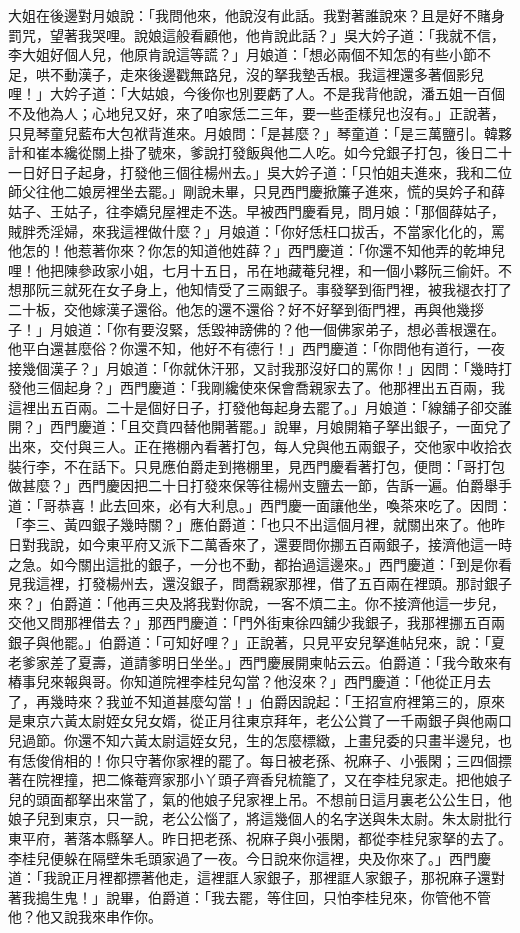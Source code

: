大姐在後邊對月娘說：「我問他來，他說沒有此話。我對著誰說來？且是好不賭身罰咒，望著我哭哩。說娘這般看顧他，他肯說此話？」吳大妗子道：「我就不信，李大姐好個人兒，他原肯說這等謊？」月娘道：「想必兩個不知怎的有些小節不足，哄不動漢子，走來後邊戳無路兒，沒的拏我墊舌根。我這裡還多著個影兒哩！」大妗子道：「大姑娘，今後你也別要虧了人。不是我背他說，潘五姐一百個不及他為人；心地兒又好，來了咱家恁二三年，要一些歪樣兒也沒有。」正說著，只見琴童兒藍布大包袱背進來。月娘問：「是甚麼？」琴童道：「是三萬鹽引。韓夥計和崔本纔從關上掛了號來，爹說打發飯與他二人吃。如今兌銀子打包，後日二十一日好日子起身，打發他三個往楊州去。」吳大妗子道：「只怕姐夫進來，我和二位師父往他二娘房裡坐去罷。」剛說未畢，只見西門慶掀簾子進來，慌的吳妗子和薛姑子、王姑子，往李嬌兒屋裡走不迭。早被西門慶看見，問月娘：「那個薛姑子，賊胖禿淫婦，來我這裡做什麼？」月娘道：「你好恁枉口拔舌，不當家化化的，罵他怎的！他惹著你來？你怎的知道他姓薛？」西門慶道：「你還不知他弄的乾坤兒哩！他把陳參政家小姐，七月十五日，吊在地藏菴兒裡，和一個小夥阮三偷奸。不想那阮三就死在女子身上，他知情受了三兩銀子。事發拏到衙門裡，被我褪衣打了二十板，交他嫁漢子還俗。他怎的還不還俗？好不好拏到衙門裡，再與他幾拶子！」月娘道：「你有要沒緊，恁毀神謗佛的？他一個佛家弟子，想必善根還在。他平白還甚麼俗？你還不知，他好不有德行！」西門慶道：「你問他有道行，一夜接幾個漢子？」月娘道：「你就休汗邪，又討我那沒好口的罵你！」因問：「幾時打發他三個起身？」西門慶道：「我剛纔使來保會喬親家去了。他那裡出五百兩，我這裡出五百兩。二十是個好日子，打發他每起身去罷了。」月娘道：「線舖子卻交誰開？」西門慶道：「且交賁四替他開著罷。」說畢，月娘開箱子拏出銀子，一面兌了出來，交付與三人。正在捲棚內看著打包，每人兌與他五兩銀子，交他家中收拾衣裝行李，不在話下。只見應伯爵走到捲棚里，見西門慶看著打包，便問：「哥打包做甚麼？」西門慶因把二十日打發來保等往楊州支鹽去一節，告訴一遍。伯爵舉手道：「哥恭喜！此去回來，必有大利息。」西門慶一面讓他坐，喚茶來吃了。因問：「李三、黃四銀子幾時關？」應伯爵道：「也只不出這個月裡，就關出來了。他昨日對我說，如今東平府又派下二萬香來了，還要問你挪五百兩銀子，接濟他這一時之急。如今關出這批的銀子，一分也不動，都抬過這邊來。」西門慶道：「到是你看見我這裡，打發楊州去，還沒銀子，問喬親家那裡，借了五百兩在裡頭。那討銀子來？」伯爵道：「他再三央及將我對你說，一客不煩二主。你不接濟他這一步兒，交他又問那裡借去？」那西門慶道：「門外街東徐四舖少我銀子，我那裡挪五百兩銀子與他罷。」伯爵道：「可知好哩？」正說著，只見平安兒拏進帖兒來，說：「夏老爹家差了夏壽，道請爹明日坐坐。」西門慶展開柬帖云云。伯爵道：「我今敢來有樁事兒來報與哥。你知道院裡李桂兒勾當？他沒來？」西門慶道：「他從正月去了，再幾時來？我並不知道甚麼勾當！」伯爵因說起：「王招宣府裡第三的，原來是東京六黃太尉姪女兒女婿，從正月往東京拜年，老公公賞了一千兩銀子與他兩口兒過節。你還不知六黃太尉這姪女兒，生的怎麼標緻，上畫兒委的只畫半邊兒，也有恁俊俏相的！你只守著你家裡的罷了。每日被老孫、祝麻子、小張閑；三四個摽著在院裡撞，把二條菴齊家那小丫頭子齊香兒梳籠了，又在李桂兒家走。把他娘子兒的頭面都拏出來當了，氣的他娘子兒家裡上吊。不想前日這月裏老公公生日，他娘子兒到東京，只一說，老公公惱了，將這幾個人的名字送與朱太尉。朱太尉批行東平府，著落本縣拏人。昨日把老孫、祝麻子與小張閑，都從李桂兒家拏的去了。李桂兒便躲在隔壁朱毛頭家過了一夜。今日說來你這裡，央及你來了。」西門慶道：「我說正月裡都摽著他走，這裡誆人家銀子，那裡誆人家銀子，那祝麻子還對著我搗生鬼！」說畢，伯爵道：「我去罷，等住回，只怕李桂兒來，你管他不管他？他又說我來串作你。